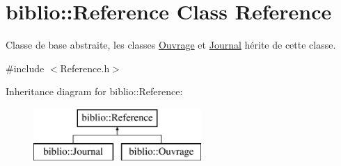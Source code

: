 \hypertarget{classbiblio_1_1Reference}{}\section{biblio\+:\+:Reference Class Reference}
\label{classbiblio_1_1Reference}


Classe de base abstraite, les classes \hyperlink{classbiblio_1_1Ouvrage}{Ouvrage} et \hyperlink{classbiblio_1_1Journal}{Journal} hérite de cette classe.  




{\ttfamily \#include $<$Reference.\+h$>$}

Inheritance diagram for biblio\+:\+:Reference\+:\begin{figure}[H]
\begin{center}
\leavevmode
\includegraphics[height=2.000000cm]{classbiblio_1_1Reference}
\end{center}
\end{figure}
